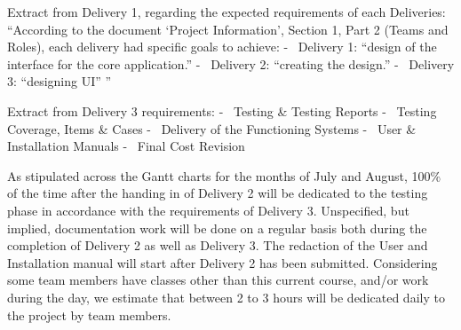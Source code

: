 \documentclass[12pt]{article}
\begin{document}
Extract from Delivery 1, regarding the expected requirements of each Deliveries:\newline
“According to the document ‘Project Information’, Section 1, Part 2 (Teams and Roles), each
delivery had specific goals to achieve:\newline
- \ Delivery 1: “design of the interface for the core application.”\newline
- \ Delivery 2: “creating the design.”\newline
- \ Delivery 3: “designing UI” ”\par

Extract from Delivery 3 requirements:\newline
- \ Testing \& Testing Reports\newline
- \ Testing Coverage, Items \& Cases\newline
- \ Delivery of the Functioning Systems\newline
- \ User \& Installation Manuals\newline
- \ Final Cost Revision
\par

As stipulated across the Gantt charts for the months of July and August, 100\% of the time after the handing in of Delivery 2 will be dedicated to the testing phase in accordance with the requirements of Delivery 3. Unspecified, but implied, documentation work will be done on a regular basis both during the completion of Delivery 2 as well as Delivery 3. The redaction of the User and Installation manual will start after Delivery 2 has been submitted. Considering some team members have classes other than this current course, and/or work during the day, we estimate that between 2 to 3 hours will be dedicated daily to the project by team members. 
\vspace*{0.2in}
\end{document}

